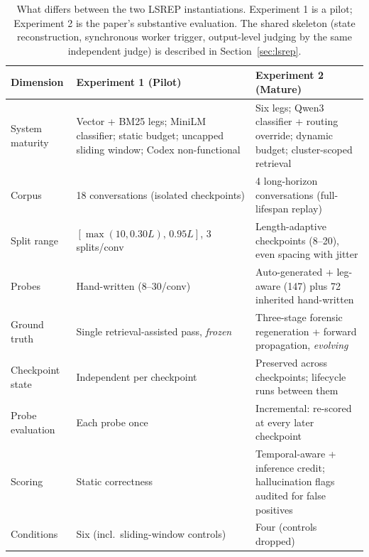 \documentclass[10pt]{article}
\begin{document}
\begin{table}[htbp]
\centering
\small
\caption{What differs between the two LSREP instantiations. Experiment 1 is a pilot; Experiment 2 is the paper's substantive evaluation. The shared skeleton (state reconstruction, synchronous worker trigger, output-level judging by the same independent judge) is described in Section~\ref{sec:lsrep}.}
\label{tab:exp-diff}
\begin{tabular}{@{}L{3.3cm}L{5.0cm}L{5.0cm}@{}}
\toprule
\textbf{Dimension} & \textbf{Experiment 1 (Pilot)} & \textbf{Experiment 2 (Mature)} \\
\midrule
System maturity & Vector + BM25 legs; MiniLM classifier; static budget; uncapped sliding window; Codex non-functional & Six legs; Qwen3 classifier + routing override; dynamic budget; cluster-scoped retrieval \\
Corpus & 18 conversations (isolated checkpoints) & 4 long-horizon conversations (full-lifespan replay) \\
Split range & $[\max(10,0.30L),\,0.95L]$, 3 splits/conv & Length-adaptive checkpoints (8--20), even spacing with jitter \\
Probes & Hand-written (8--30/conv) & Auto-generated + leg-aware (147) plus 72 inherited hand-written \\
Ground truth & Single retrieval-assisted pass, \emph{frozen} & Three-stage forensic regeneration + forward propagation, \emph{evolving} \\
Checkpoint state & Independent per checkpoint & Preserved across checkpoints; lifecycle runs between them \\
Probe evaluation & Each probe once & Incremental: re-scored at every later checkpoint \\
Scoring & Static correctness & Temporal-aware + inference credit; hallucination flags audited for false positives \\
Conditions & Six (incl.\ sliding-window controls) & Four (controls dropped) \\
\bottomrule
\end{tabular}
\end{table}
\end{document}

